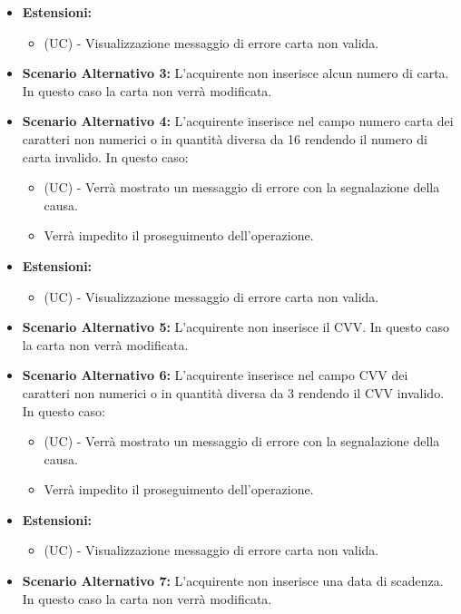 \begin{itemize}
    \item \textbf{Estensioni:}
    \begin{itemize}
        \item (UC) - Visualizzazione messaggio di errore carta non valida.
    \end{itemize}
    \item \textbf{Scenario Alternativo 3:} L'acquirente non inserisce alcun numero di carta. In questo caso la carta non verrà modificata.
    \item \textbf{Scenario Alternativo 4:} L'acquirente inserisce nel campo numero carta dei caratteri non numerici o in quantità diversa da 16 rendendo il numero di carta invalido. In questo caso:
    \begin{itemize}
        \item (UC) - Verrà mostrato un messaggio di errore con la segnalazione della causa.
        \item Verrà impedito il proseguimento dell'operazione.
    \end{itemize}
    \item \textbf{Estensioni:}
    \begin{itemize}
        \item (UC) - Visualizzazione messaggio di errore carta non valida.
    \end{itemize}
    \item \textbf{Scenario Alternativo 5:} L'acquirente non inserisce il CVV. In questo caso la carta non verrà modificata.
    \item \textbf{Scenario Alternativo 6:} L'acquirente inserisce nel campo CVV dei caratteri non numerici o in quantità diversa da 3 rendendo il CVV invalido. In questo caso:
    \begin{itemize}
        \item (UC) - Verrà mostrato un messaggio di errore con la segnalazione della causa.
        \item Verrà impedito il proseguimento dell'operazione.
    \end{itemize}
    \item \textbf{Estensioni:}
    \begin{itemize}
        \item (UC) - Visualizzazione messaggio di errore  carta non valida.
    \end{itemize}
    \item \textbf{Scenario Alternativo 7:} L'acquirente non inserisce una data di scadenza. In questo caso la carta non verrà modificata.
\end{itemize}

